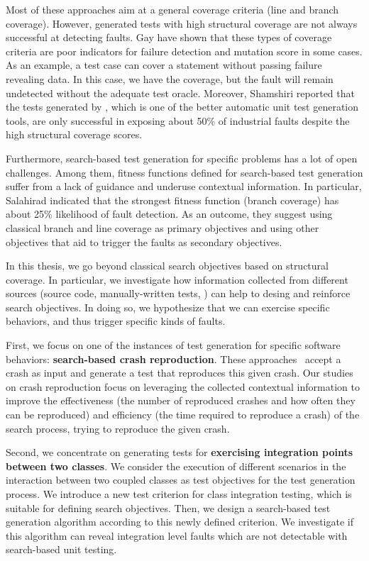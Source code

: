 Most of these approaches aim at a general coverage criteria (\eg line and branch coverage). However,  generated tests with high structural coverage are not always successful at detecting faults. Gay \etal \cite{gay2015risks} have shown that these types of coverage criteria are poor indicators for failure detection and mutation score in some cases. As an example, a test case can cover a statement without passing failure revealing data. In this case, we have the coverage, but the fault will remain undetected without the adequate test oracle.
Moreover, Shamshiri \etal \cite{Shamshiri2016} reported that the tests generated by \evosuite, which is one of the better automatic unit test generation tools, are only successful in exposing about 50\% of industrial faults despite the high structural coverage scores. 

Furthermore, search-based test generation for specific problems has a lot of open challenges. Among them, fitness functions defined for search-based test generation suffer from a lack of guidance and underuse contextual information.  
In particular, Salahirad \etal \cite{Salahirad2019} indicated that the strongest fitness function (branch coverage) has about 25\% likelihood of fault detection.
As an outcome, they suggest using classical branch and line coverage as primary objectives and using other objectives that aid to trigger the faults as secondary objectives.

In this thesis, we go beyond classical search objectives based on structural coverage. In particular, we investigate how information collected from different sources (\ie source code, manually-written tests, \etc) can help to desing and reinforce search objectives. In doing so, we hypothesize that we can exercise specific behaviors, and thus trigger specific kinds of faults.


First, we focus on one of the instances of test generation for specific software behaviors: \textbf{search-based crash reproduction}. These approaches~\cite{Soltani2018a, BPT17concrash, Chen2015, Nayrolles2017, Rossler2013, Xuan2015} accept a crash as input and generate a test that reproduces this given crash. Our studies on crash reproduction focus on leveraging the collected contextual information to improve the effectiveness (\ie the number of reproduced crashes and how often they can be reproduced) and efficiency (\ie the time required to reproduce a crash) of the search process, trying to reproduce the given crash.

Second, we concentrate on generating tests for \textbf{exercising integration points between two classes}. We consider the execution of different scenarios in the interaction between two coupled classes as test objectives for the test generation process. We introduce a new test criterion for class integration testing, which is suitable for defining search objectives. Then, we design a search-based test generation algorithm according to this newly defined criterion. We investigate if this algorithm can reveal integration level faults which are not detectable with search-based unit testing.

